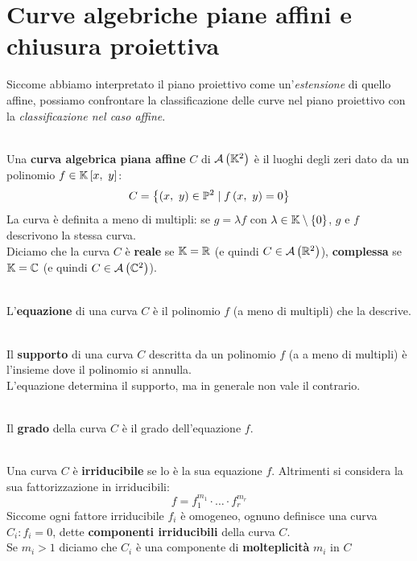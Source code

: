 \section{Curve algebriche piane affini e chiusura proiettiva}
Siccome abbiamo interpretato il piano proiettivo come un'\textit{estensione} di quello affine, possiamo confrontare la classificazione delle curve nel piano proiettivo con la \textit{classificazione nel caso affine}.
\begin{define}~{}\\
	Una \textbf{curva algebrica piana affine} $C$ di ${\mathcal{A}\left(\mathbb{K}^2\right)}$ è il luoghi degli zeri dato da un polinomio $f\in\kamp\left[x,\ y\right]$:
\begin{equation}
	C=\left\{\left(x,\ y\right)\in\proj[2]{\ }\mid f\left(x,\ y\right)=0\right\}
\end{equation}
La curva è definita a meno di multipli: se $g=\lambda f$ con $\lambda\in\mathbb{K}\setminus\left\{0\right\}$, $g$ e $f$ descrivono la stessa curva.\\
Diciamo che la curva $C$ è \textbf{reale} se $\mathbb{K}=\mathbb{R}$ (e quindi $C\in{\ensuremath{\mathcal{A}\left(\mathbb{R}^2\right)}}$), \textbf{complessa} se $\mathbb{K}=\mathbb{C}$ (e quindi $C\in{\ensuremath{\mathcal{A}\left(\mathbb{C}^2\right)}}$).
\end{define}
\begin{define}~{}\\
L'\textbf{equazione} di una curva $C$ è il polinomio $f$ (a meno di multipli) che la descrive.
\end{define}
\begin{define}~{}\\
Il \textbf{supporto} di una curva $C$ descritta da un polinomio $f$ (a a meno di multipli) è l'insieme dove il polinomio si annulla.\\
L'equazione determina il supporto, ma in generale non vale il contrario.
\end{define}
\begin{define}~{}\\
Il \textbf{grado} della curva $C$ è il grado dell'equazione $f$.
\end{define}
\begin{define}~{}\\
	Una curva $C$ è \textbf{irriducibile} se lo è la sua equazione $f$. Altrimenti si considera la sua fattorizzazione in irriducibili:
	\begin{equation}
		f=f_1^{m_1}\cdot \ldots \cdot f_r^{m_r}
	\end{equation}
	Siccome ogni fattore irriducibile $f_i$ è omogeneo, ognuno definisce una curva $C_i\colon f_i=0$, dette \textbf{componenti irriducibili} della curva $C$.\\
	Se $m_i>1$ diciamo che $C_i$ è una componente di \textbf{molteplicità} $m_i$ in $C$
\end{define}
